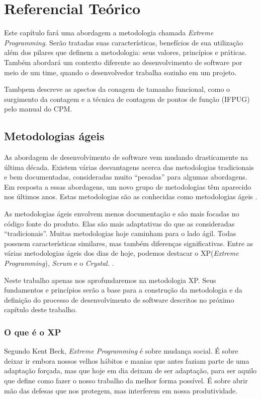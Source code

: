\chapter[Referencial Teórico]{Referencial Teórico}

Este capítulo fará uma abordagem a metodologia chamada \textit{Extreme Programming}. Serão tratadas suas características, benefícios de sua utilização além dos pilares que definem a metodologia: seus valores, princípios e práticas.
Também abordará um contexto diferente ao desenvolvimento de software por meio de um time, quando o desenvolvedor trabalha sozinho em um projeto.

Tambpem descreve as apsctos da conagem de tamanho funcional, como o surgimento da contagem e a técnica de contagem de pontos de função (IFPUG) pelo manual do CPM.

\section{Metodologias ágeis}

As abordagem de desenvolvimento de software vem mudando drasticamente na última década. Existem várias desvantagens acerca das metodologias tradicionais e bem documentadas, consideradas muito “pesadas” para algumas abordagens. Em resposta a essas abordagens, um novo grupo de metodologias têm aparecido nos últimos anos. Estas metodologias são as conhecidas como metodologias ágeis \cite{Agarwal:2008}.

As metodologias ágeis envolvem menos documentação e são mais focadas no código fonte do produto. Elas são mais adaptativas do que as consideradas “tradicionais”. Muitas metodologias hoje caminham para o lado ágil. Todas possuem características similares, mas também diferenças significativas. Entre as várias metodologias ágeis dos dias de hoje, podemos destacar o XP(\textit{Extreme Programming}), \textit{Scrum} e o \textit{Crystal.} \cite{Agarwal:2008}.

Neste trabalho apenas nos aprofundaremos na metodologia XP. Seus fundamentos e princípios serão a base para a construção da metodologia e da definição do processo de desenvolvimento de software descritos no próximo capítulo deste trabalho.

\subsection{O que é o XP}

Segundo Kent Beck, \cite{Beck:2004} \textit{Extreme Programming} é sobre mudança social. É sobre deixar ir embora nossos velhos hábitos e manias que antes faziam parte de uma adaptação forçada, mas que hoje em dia deixam de ser adaptação, para ser aquilo que define como fazer o nosso trabalho da melhor forma possível. É sobre abrir mão das defesas que nos protegem, mas interferem em nossa produtividade.

